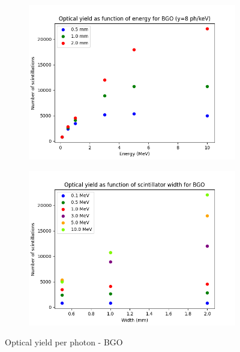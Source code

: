 \documentclass{article}
\begin{document}
\begin{figure}[H]
\centering
\begin{subfigure}{.5\textwidth}
  \centering
  \includegraphics[width=\linewidth]{images/task3/scintills_energy_BGO.png}
  \caption{}
\end{subfigure}%
\begin{subfigure}{.5\textwidth}
  \centering
  \includegraphics[width=\linewidth]{images/task3/scintills_width_BGO_part.png}
  \caption{}
\end{subfigure}
\caption{Optical yield per photon - BGO}
\end{figure}
\end{document}
